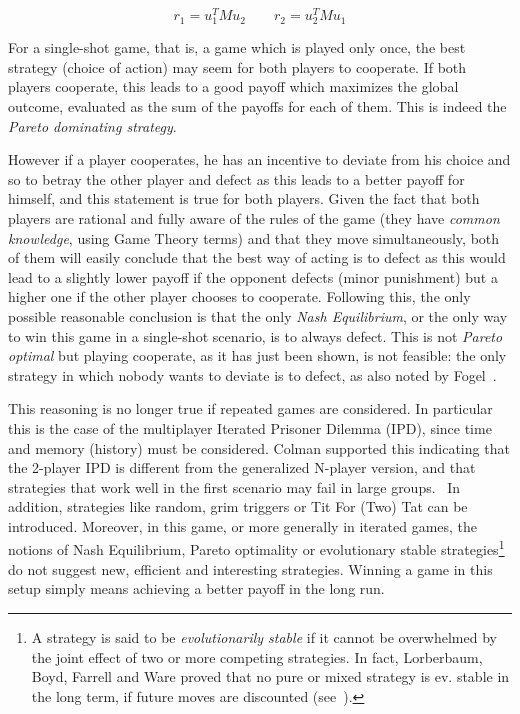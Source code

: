 \documentclass[journal,a4paper,10pt,twoside]{IEEEtran} %
\begin{document}
$$
r_1 = u_1^T M u_2
\quad
\quad
r_2 = u_2^T M u_1
$$

For a single-shot game, that is, a game which is played only once, the best strategy (choice of action) may seem for both players to cooperate. If both players cooperate, this leads to a good payoff which maximizes the global outcome, evaluated as the sum of the payoffs for each of them. This is indeed the \textit{Pareto dominating strategy}.

However if a player cooperates, he has an incentive to deviate from his choice and so to betray the other player and defect as this leads to a better payoff for himself, and this statement is true for both players. 
Given the fact that both players are rational and fully aware of the rules of the game (they have \textit{common knowledge}, using Game Theory terms) and that they move simultaneously, both of them will easily conclude that the best way of acting is to defect as this would lead to a slightly lower payoff if the opponent defects (minor punishment) but a higher one if the other player chooses to cooperate.
Following this, the only possible reasonable conclusion is that the only \textit{Nash Equilibrium}, or the only way to win this game in a single-shot scenario, is to always defect.
This is not \textit{Pareto optimal} but playing cooperate, as it has just been shown, is not feasible: the only strategy in which nobody wants to deviate is to defect, as also noted by Fogel~\cite{fogelEvolvingBehaviors}.

This reasoning is no longer true if repeated games are considered. In particular this is the case of the multiplayer Iterated Prisoner Dilemma (IPD), since time and memory (history) must be considered.
Colman supported this indicating that the 2-player IPD is different from the generalized N-player version, and that strategies that work well in the first scenario may fail in large groups.~\cite{yao1994experimental}
In addition, strategies like random, grim triggers or Tit For (Two) Tat can be introduced.
Moreover, in this game, or more generally in iterated games, the notions of Nash Equilibrium, Pareto optimality or evolutionary stable strategies\footnote{A strategy is said to be \textit{evolutionarily stable} if it cannot be overwhelmed by the joint effect of two or more competing strategies. In fact, Lorberbaum, Boyd, Farrell and Ware proved that no pure or mixed strategy is ev. stable in the long term, if future moves are discounted (see~\cite{lorb94}).} do not suggest new, efficient and interesting strategies. \cite{mathieu2017}
Winning a game in this setup simply means achieving a better payoff in the long run.
\end{document}
